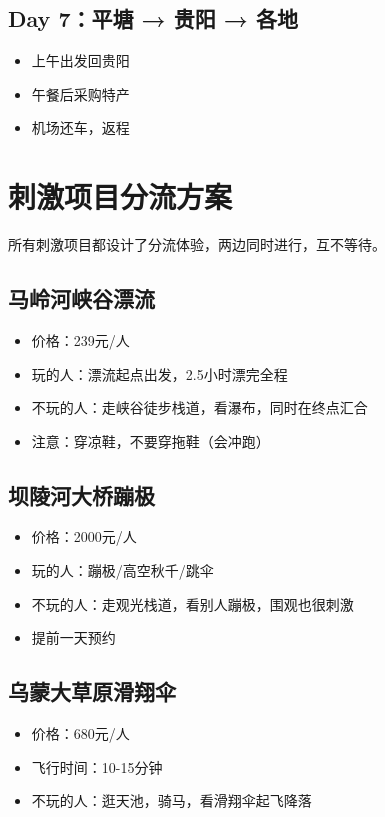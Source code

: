 \documentclass[12pt,a4paper,UTF8]{ctexart}
\begin{document}
\subsection{Day 7：平塘 → 贵阳 → 各地}
\begin{itemize}
\item 上午出发回贵阳
\item 午餐后采购特产
\item 机场还车，返程
\end{itemize}

\newpage

\section{刺激项目分流方案}

所有刺激项目都设计了分流体验，两边同时进行，互不等待。

\subsection{马岭河峡谷漂流}
\begin{itemize}
\item 价格：239元/人
\item 玩的人：漂流起点出发，2.5小时漂完全程
\item 不玩的人：走峡谷徒步栈道，看瀑布，同时在终点汇合
\item 注意：穿凉鞋，不要穿拖鞋（会冲跑）
\end{itemize}

\subsection{坝陵河大桥蹦极}
\begin{itemize}
\item 价格：2000元/人
\item 玩的人：蹦极/高空秋千/跳伞
\item 不玩的人：走观光栈道，看别人蹦极，围观也很刺激
\item 提前一天预约
\end{itemize}

\subsection{乌蒙大草原滑翔伞}
\begin{itemize}
\item 价格：680元/人
\item 飞行时间：10-15分钟
\item 不玩的人：逛天池，骑马，看滑翔伞起飞降落
\end{itemize}
\end{document}
